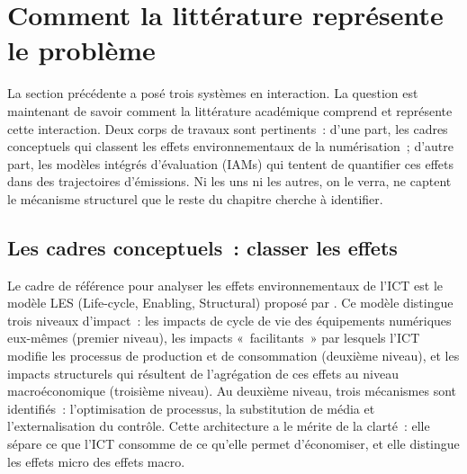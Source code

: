 \clearpage
\section{Comment la littérature représente le problème}\label{sec:litterature}


La section précédente a posé trois systèmes en interaction. La question est maintenant de savoir comment la littérature académique comprend et représente cette interaction. Deux corps de travaux sont pertinents~: d'une part, les cadres conceptuels qui classent les effets environnementaux de la numérisation~; d'autre part, les modèles intégrés d'évaluation (IAMs) qui tentent de quantifier ces effets dans des trajectoires d'émissions. Ni les uns ni les autres, on le verra, ne captent le mécanisme structurel que le reste du chapitre cherche à identifier.


\subsection{Les cadres conceptuels~: classer les effets}\label{subsec:cadres}

Le cadre de référence pour analyser les effets environnementaux de l'ICT est le modèle LES (Life-cycle, Enabling, Structural) proposé par \textcite{hilty_ict_2015}. Ce modèle distingue trois niveaux d'impact~: les impacts de cycle de vie des équipements numériques eux-mêmes (premier niveau), les impacts «~facilitants~» par lesquels l'ICT modifie les processus de production et de consommation (deuxième niveau), et les impacts structurels qui résultent de l'agrégation de ces effets au niveau macroéconomique (troisième niveau). Au deuxième niveau, trois mécanismes sont identifiés~: l'optimisation de processus, la substitution de média et l'externalisation du contrôle. Cette architecture a le mérite de la clarté~: elle sépare ce que l'ICT consomme de ce qu'elle permet d'économiser, et elle distingue les effets micro des effets macro.

